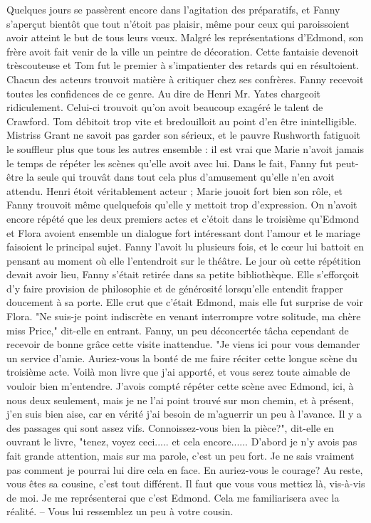 Quelques jours se passèrent encore dans l'agitation des préparatifs, et Fanny s'aperçut bientôt que tout n'étoit pas plaisir, même pour ceux qui paroissoient avoir atteint le but de tous leurs vœux.
Malgré les représentations d'Edmond, son frère avoit fait venir de la ville un peintre de décoration. Cette fantaisie devenoit trèscouteuse\setcounter{page}{126} et Tom fut le premier à s'impatienter des retards qui en résultoient.
Chacun des acteurs trouvoit matière à critiquer chez ses confrères. Fanny recevoit toutes les confidences de ce genre. Au dire de Henri Mr. Yates chargeoit ridiculement. Celui-ci trouvoit qu'on avoit beaucoup exagéré le talent de Crawford. Tom débitoit trop vite et bredouilloit au point d'en être inintelligible. Mistriss Grant ne savoit pas garder son sérieux, et le pauvre Rushworth fatiguoit le souffleur plus que tous les autres ensemble : il est vrai que Marie n'avoit jamais le temps de répéter les scènes qu'elle avoit avec lui.
Dans le fait, Fanny fut peut-être la seule qui trouvât dans tout cela plus d'amusement qu'elle n'en avoit attendu. Henri étoit véritablement acteur ; Marie jouoit fort bien son rôle, et Fanny trouvoit même quelquefois qu'elle y mettoit trop d'expression.
On n'avoit encore répété que les deux premiers actes et c'étoit dans le troisième qu'Edmond et Flora avoient ensemble un dialogue fort intéressant dont l'amour et le mariage faisoient le principal sujet. Fanny l'avoit lu plusieurs fois, et le cœur lui battoit en pensant au moment où elle l'entendroit\setcounter{page}{127} sur le théâtre. Le jour où cette répétition devait avoir lieu, Fanny s'était retirée dans sa petite bibliothèque. Elle s'efforçoit d'y faire provision de philosophie et de générosité lorsqu'elle entendit frapper doucement à sa porte. Elle crut que c'était Edmond, mais elle fut surprise de voir Flora.
"Ne suis-je point indiscrète en venant interrompre votre solitude, ma chère miss Price," dit-elle en entrant. Fanny, un peu déconcertée tâcha cependant de recevoir de bonne grâce cette visite inattendue.
"Je viens ici pour vous demander un service d'amie. Auriez-vous la bonté de me faire réciter cette longue scène du troisième acte. Voilà mon livre que j'ai apporté, et vous serez toute aimable de vouloir bien m'entendre. J'avois compté répéter cette scène avec Edmond, ici, à nous deux seulement, mais je ne l'ai point trouvé sur mon chemin, et à présent, j'en suis bien aise, car en vérité j'ai besoin de m'aguerrir un peu à l'avance. Il y a des passages qui sont assez vifs. Connoissez-vous bien la pièce?", dit-elle en ouvrant le livre, "tenez, voyez ceci..... et cela encore...... D'abord je n'y avois pas fait grande attention, mais sur ma parole, c'est un peu fort. Je ne sais vraiment pas\setcounter{page}{128} comment je pourrai lui dire cela en face. En auriez-vous le courage? Au reste, vous êtes sa cousine, c’est tout différent. Il faut que vous vous mettiez là, vis-à-vis de moi. Je me représenterai que c’est Edmond. Cela me familiarisera avec la réalité. – Vous lui ressemblez un peu à votre cousin.
